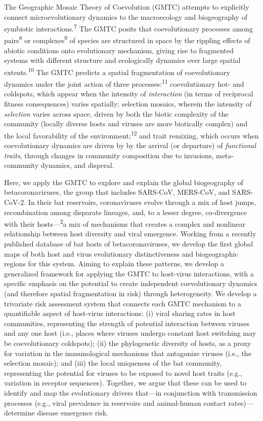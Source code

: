 \documentclass[10pt,oneside]{article}
\begin{document}
The Geographic Mosaic Theory of Coevolution (GMTC) attempts to
explicitly connect microevolutionary dynamics to the macroecology and
biogeography of symbiotic interactions.\textsuperscript{7} The GMTC
posits that coevolutionary processes among pairs\textsuperscript{8} or
complexes\textsuperscript{9} of species are structured in space by the
rippling effects of abiotic conditions onto evolutionary mechanism,
giving rise to fragmented systems with different structure and
ecologically dynamics over large spatial extents.\textsuperscript{10}
The GMTC predicts a spatial fragmentation of coevolutionary dynamics
under the joint action of three processes:\textsuperscript{11}
coevolutionary hot- and coldspots, which appear when the intensity of
\emph{interaction} (in terms of reciprocal fitness consequences) varies
spatially; selection mosaics, wherein the intensity of \emph{selection}
varies across space, driven by both the biotic complexity of the
community (locally diverse hosts and viruses are more biotically
complex) and the local favorability of the
environment;\textsuperscript{12} and trait remixing, which occurs when
coevolutionary dynamics are driven by by the arrival (or departure) of
\emph{functional traits}, through changes in community composition due
to invasions, meta-community dynamics, and disperal.

Here, we apply the GMTC to explore and explain the global biogeography
of betacoronaviruses, the group that includes SARS-CoV, MERS-CoV, and
SARS-CoV-2. In their bat reservoirs, coronaviruses evolve through a mix
of host jumps, recombination among disparate lineages, and, to a lesser
degree, co-divergence with their hosts---\textsuperscript{2}a mix of
mechanisms that creates a complex and nonlinear relationship between
host diversity and viral emergence. Working from a recently published
database of bat hosts of betacoronaviruses, we develop the first global
maps of both host and virus evolutionary distinctiveness and
biogeographic regions for this system. Aiming to explain these patterns,
we develop a generalized framework for applying the GMTC to host-virus
interactions, with a specific emphasis on the potential to create
independent coevolutionary dynamics (and therefore spatial fragmentation
in risk) through heterogeneity. We develop a trivariate risk assessment
system that connects each GMTC mechanism to a quantifiable aspect of
host-virus interactions: (i) viral sharing rates in host communities,
representing the strength of potential interaction between viruses and
any one host (i.e., places where viruses undergo constant host switching
may be coevolutionary coldspots); (ii) the phylogenetic diversity of
hosts, as a proxy for variation in the immunological mechanisms that
antagonize viruses (i.e., the selection mosaic); and (iii) the local
uniqueness of the bat community, representing the potential for viruses
to be exposed to novel host traits (e.g., variation in receptor
sequences). Together, we argue that these can be used to identify and
map the evolutionary drivers that---in conjunction with transmission
processes (e.g., viral prevalence in reservoirs and animal-human contact
rates)--- determine disease emergence risk.
\end{document}
